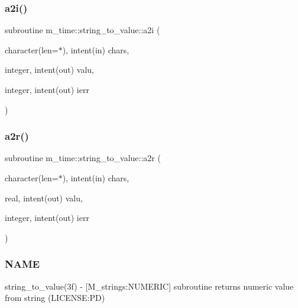 \mbox{\label{interfacem__time_1_1string__to__value_a6b07c7d16ad4033167209109583282c8}} 
\subsubsection{\texorpdfstring{a2i()}{a2i()}}
{\footnotesize\ttfamily subroutine m\+\_\+time\+::string\+\_\+to\+\_\+value\+::a2i (\begin{DoxyParamCaption}\item[{character(len=$\ast$), intent(in)}]{chars,  }\item[{integer, intent(out)}]{valu,  }\item[{integer, intent(out)}]{ierr }\end{DoxyParamCaption})\hspace{0.3cm}{\ttfamily [private]}}

\mbox{\label{interfacem__time_1_1string__to__value_a5fa7202ea5e4570e7ab54c7ec8188f57}} 
\subsubsection{\texorpdfstring{a2r()}{a2r()}}
{\footnotesize\ttfamily subroutine m\+\_\+time\+::string\+\_\+to\+\_\+value\+::a2r (\begin{DoxyParamCaption}\item[{character(len=$\ast$), intent(in)}]{chars,  }\item[{real, intent(out)}]{valu,  }\item[{integer, intent(out)}]{ierr }\end{DoxyParamCaption})\hspace{0.3cm}{\ttfamily [private]}}



\subsubsection*{N\+A\+ME}

string\+\_\+to\+\_\+value(3f) -\/ \mbox{[}M\+\_\+strings\+:N\+U\+M\+E\+R\+IC\mbox{]} subroutine returns numeric value from string (L\+I\+C\+E\+N\+SE\+:PD) 

